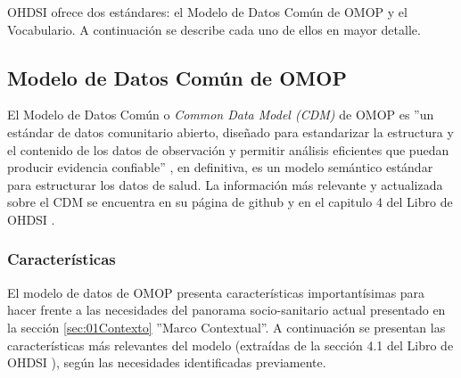 OHDSI ofrece dos estándares: el Modelo de Datos Común de OMOP y el Vocabulario. A continuación se describe cada uno de ellos en mayor detalle.


\subsection{Modelo de Datos Común de OMOP} \label{subsec:07cdm}

El Modelo de Datos Común o \textit{Common Data Model (CDM)} de OMOP es ''un estándar de datos comunitario abierto, diseñado para estandarizar la estructura y el contenido de los datos de observación y permitir análisis eficientes que puedan producir evidencia confiable'' \parencite{gitPagesCMD}, en definitiva, es un modelo semántico estándar para estructurar los datos de salud. La información más relevante y actualizada sobre el CDM se encuentra en su página de github \parencite{gitPagesCMD} y en el capitulo 4 del Libro de OHDSI \parencite{OHDSIbook}.

\subsubsection{Características}

El modelo de datos de OMOP presenta características importantísimas para hacer frente a las necesidades del panorama socio-sanitario actual presentado en la sección \ref{sec:01Contexto} ''Marco Contextual''. A continuación se presentan las características más relevantes del modelo (extraídas de la sección  4.1 del Libro de OHDSI \parencite{OHDSIbook}), según las necesidades identificadas previamente.


